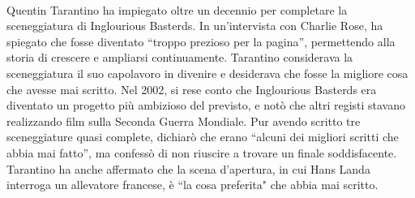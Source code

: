 \documentclass[12pt]{article} %
\begin{document}
\begin{flushleft}
    \\\vspace{1cm}
    Quentin Tarantino ha impiegato oltre un decennio per completare la sceneggiatura di Inglourious Basterds. In un’intervista con Charlie Rose, ha spiegato che fosse diventato “troppo prezioso per la pagina”, permettendo alla storia di crescere e ampliarsi continuamente. 
    Tarantino considerava la sceneggiatura il suo capolavoro in divenire e desiderava che fosse la migliore cosa che avesse mai scritto.  
    Nel 2002, si rese conto che Inglourious Basterds era diventato un progetto più ambizioso del previsto, e notò che altri registi stavano realizzando film sulla Seconda Guerra Mondiale. Pur avendo scritto tre sceneggiature quasi complete, dichiarò che erano “alcuni dei migliori scritti che abbia mai fatto”, ma confessò di non riuscire a trovare un finale soddisfacente. 
    Tarantino ha anche affermato che la scena d’apertura, in cui Hans Landa interroga un allevatore francese, è “la cosa preferita" che abbia mai scritto.
\end{flushleft}
\break
\end{document}
